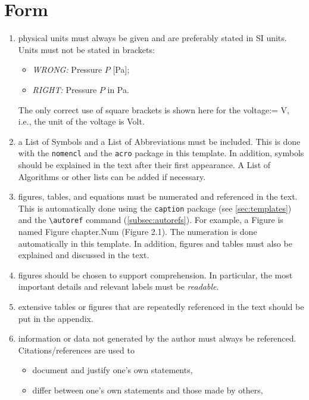 \section{Form}
\begin{enumerate}
	\item physical units must always be given and are preferably stated in SI units. Units must not be stated in brackets:
	      \begin{itemize}
		      \item \emph{WRONG:} Pressure $P$ [Pa];
		      \item \emph{RIGHT:} Pressure $P$ in Pa.
	      \end{itemize}
	      The only correct use of square brackets is shown here for the voltage:\newline
	      [U] = \si{\volt}, i.e., the unit of the voltage is Volt.
	\item a List of Symbols and a List of Abbreviations must be included. This is done with the \verb+nomencl+ and the \verb+acro+ package in this template. In addition, symbols should be explained in the text after their first appearance. A List of Algorithms or other lists can be added if necessary.
	\item figures, tables, and equations must be numerated and referenced in the text. This is automatically done using the \verb+caption+ package (see \autoref{sec:templates}) and the \verb+\autoref+ command (\autoref{subsec:autorefs}). For example, a Figure is named Figure chapter.Num (Figure 2.1). The numeration is done automatically in this template. In addition, figures and  tables must also be explained and discussed in the text.
	\item figures should be chosen to support comprehension. In particular, the most important details and relevant labels must be \emph{readable}.
	\item extensive tables or figures that are repeatedly referenced in the text should be put in the appendix.
	\item information or data not generated by the author must always be referenced. Citations/references are used to
	      \begin{itemize}
		      \item document and justify one's own statements,
		      \item differ between one's own statements and those made by others,

\end{itemize}
\end{enumerate}
